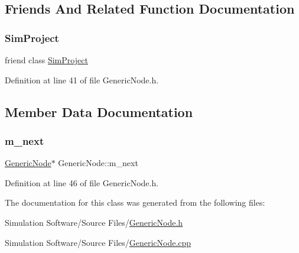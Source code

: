 \subsection{Friends And Related Function Documentation}
\mbox{\label{class_generic_node_ac000f31a1ff045f2add284ea5877f0b5}} 
\subsubsection{\texorpdfstring{Sim\+Project}{SimProject}}
{\footnotesize\ttfamily friend class \hyperlink{class_sim_project}{Sim\+Project}\hspace{0.3cm}{\ttfamily [friend]}}



Definition at line 41 of file Generic\+Node.\+h.



\subsection{Member Data Documentation}
\mbox{\label{class_generic_node_af1d326d888b277b40d55b3c67be446d7}} 
\subsubsection{\texorpdfstring{m\+\_\+next}{m\_next}}
{\footnotesize\ttfamily \hyperlink{class_generic_node}{Generic\+Node}$\ast$ Generic\+Node\+::m\+\_\+next\hspace{0.3cm}{\ttfamily [protected]}}



Definition at line 46 of file Generic\+Node.\+h.



The documentation for this class was generated from the following files\+:\begin{DoxyCompactItemize}
\item 
Simulation Software/\+Source Files/\hyperlink{_generic_node_8h}{Generic\+Node.\+h}\item 
Simulation Software/\+Source Files/\hyperlink{_generic_node_8cpp}{Generic\+Node.\+cpp}\end{DoxyCompactItemize}
